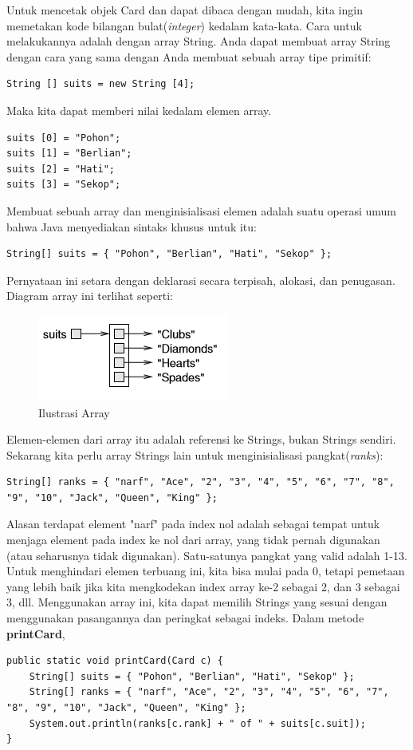 \noindent Untuk mencetak objek Card dan dapat dibaca dengan mudah, kita ingin memetakan kode bilangan bulat(\textit{integer}) kedalam kata-kata. Cara untuk melakukannya adalah dengan array String. Anda dapat membuat array String dengan cara yang sama dengan Anda membuat sebuah array tipe primitif: 
\begin{lstlisting}
String [] suits = new String [4];
\end{lstlisting}

\noindent Maka kita dapat memberi nilai kedalam elemen array.
\begin{lstlisting}
suits [0] = "Pohon";
suits [1] = "Berlian";
suits [2] = "Hati";
suits [3] = "Sekop";
\end{lstlisting}

\noindent Membuat sebuah array dan menginisialisasi elemen adalah suatu operasi umum bahwa Java menyediakan sintaks khusus untuk itu:
\begin{lstlisting}
String[] suits = { "Pohon", "Berlian", "Hati", "Sekop" };
\end{lstlisting}

\noindent Pernyataan ini setara dengan deklarasi secara terpisah, alokasi, dan penugasan. Diagram array ini terlihat seperti:
\begin{figure}[h!]
\centering
\includegraphics[scale=1]{diagram_array.png}
\caption{Ilustrasi Array}
\label{fig:univerise}
\end{figure}

\noindent Elemen-elemen dari array itu adalah referensi ke Strings, bukan Strings sendiri. Sekarang kita perlu array Strings lain untuk menginisialisasi pangkat(\textit{ranks}):
\begin{lstlisting}
String[] ranks = { "narf", "Ace", "2", "3", "4", "5", "6", "7", "8",    "9", "10", "Jack", "Queen", "King" };
\end{lstlisting}

\noindent Alasan terdapat element "narf" pada index nol adalah sebagai tempat untuk menjaga element pada index ke nol dari array, yang tidak pernah digunakan (atau seharusnya tidak digunakan). Satu-satunya pangkat yang valid adalah 1-13. Untuk menghindari elemen terbuang ini, kita bisa mulai pada 0, tetapi pemetaan yang lebih baik jika kita mengkodekan index array ke-2 sebagai 2, dan 3 sebagai 3, dll.
Menggunakan array ini, kita dapat memilih Strings yang sesuai dengan menggunakan pasangannya dan peringkat sebagai indeks. Dalam metode \textbf{printCard},
\begin{lstlisting}
public static void printCard(Card c) { 
    String[] suits = { "Pohon", "Berlian", "Hati", "Sekop" }; 
    String[] ranks = { "narf", "Ace", "2", "3", "4", "5", "6", "7", "8", "9", "10", "Jack", "Queen", "King" };
    System.out.println(ranks[c.rank] + " of " + suits[c.suit]);
}
\end{lstlisting}

